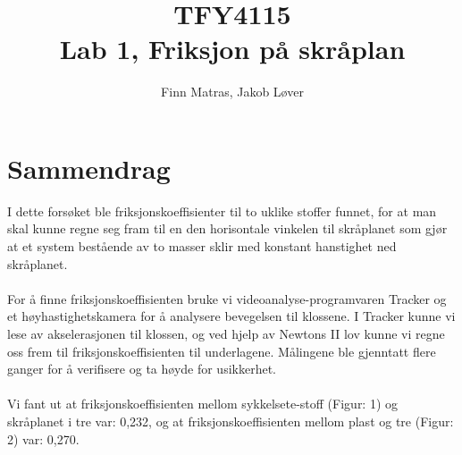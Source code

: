 \documentclass[10pt,a4paper]{report}
\author{Finn Matras, Jakob Løver}
\title{{\LARGE TFY4115}\\{\large Lab 1, Friksjon på skråplan}}
\begin{document}
\renewcommand{\contentsname}{Innhold}
\renewcommand{\cftchapleader}{\cftdotfill{\cftdotsep}}
\renewcommand{\cftpartleader}{\cftdotfill{\cftdotsep}}

\maketitle
\tableofcontents

\chapter*{Sammendrag}
I dette forsøket ble friksjonskoeffisienter til to uklike stoffer funnet, for at man skal kunne regne seg fram til en den horisontale vinkelen til skråplanet som gjør at et system bestående av to masser sklir med konstant hanstighet ned skråplanet.\\
\\For å finne friksjonskoeffisienten bruke vi videoanalyse-programvaren Tracker og et høyhastighetskamera for å analysere bevegelsen til klossene. I Tracker kunne vi lese av akselerasjonen til klossen, og ved hjelp av Newtons II lov kunne vi regne oss frem til friksjonskoeffisienten til underlagene. Målingene ble gjenntatt flere ganger for å verifisere og ta høyde for usikkerhet.\\
\\Vi fant ut at friksjonskoeffisienten mellom sykkelsete-stoff (Figur: 1) og skråplanet i tre var: 0,232, og at friksjonskoeffisienten mellom plast og tre (Figur: 2) var: 0,270.
\end{document}
